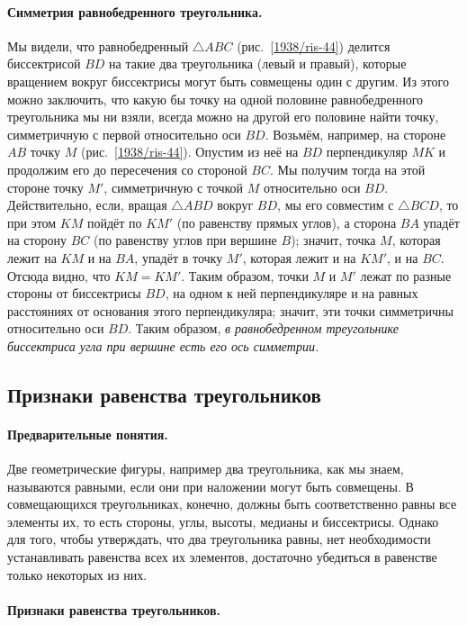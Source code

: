 \documentclass[oneside]{book}
\begin{document}
\paragraph{Симметрия равнобедренного треугольника.}\label{1938/40}
Мы видели, что равнобедренный $\triangle ABC$ (рис.~\ref{1938/ris-44}) делится биссектрисой $BD$ на такие два треугольника (левый и правый), которые вращением вокруг биссектрисы могут быть совмещены один с другим.
Из этого можно заключить, что какую бы точку на одной половине равнобедренного треугольника мы ни взяли, всегда можно на другой его половине найти точку, симметричную с первой относительно оси $BD$.
Возьмём, например, на стороне $AB$ точку $M$ (рис.~\ref{1938/ris-44}).
Опустим из неё на $BD$ перпендикуляр $MK$ и продолжим его до пересечения со стороной $BC$.
Мы получим тогда на этой стороне точку $M'$, симметричную с точкой $M$ относительно оси $BD$.
Действительно, если, вращая $\triangle ABD$ вокруг $BD$, мы его совместим с $\triangle BCD$, то при этом $KM$ пойдёт по $KM'$ (по равенству прямых углов), а сторона $BA$ упадёт на сторону $BC$ (по равенству углов при вершине $B$);
значит, точка $M$, которая лежит на $KM$ и на $BA$, упадёт в точку $M'$, которая лежит и на $KM'$, и на $BC$.
Отсюда видно, что $KM=KM'$.
Таким образом, точки $M$ и $M'$ лежат по разные стороны от биссектрисы $BD$, на одном к ней перпендикуляре и на равных расстояниях от основания этого перпендикуляра;
значит, эти точки симметричны относительно оси $BD$.
Таким образом, \emph{в равнобедренном треугольнике биссектриса угла при вершине есть его ось симметрии.}

\subsection*{Признаки равенства треугольников}

\paragraph{Предварительные понятия.}\label{1938/41}
Две геометрические фигуры, например два треугольника, как мы знаем, называются равными, если они при наложении могут быть совмещены.
В совмещающихся треугольниках, конечно, должны быть соответственно равны все элементы их, то есть стороны, углы, высоты, медианы и биссектрисы.
Однако для того, чтобы утверждать, что два треугольника равны, нет необходимости устанавливать равенства всех их элементов, достаточно убедиться в равенстве только некоторых из них.

\paragraph{Признаки равенства треугольников.}\label{1938/42}\ 
\end{document}
